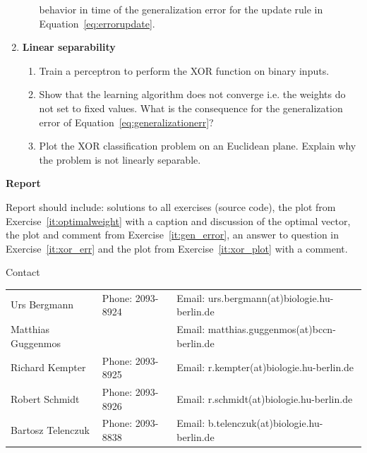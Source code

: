 \documentclass[12pt, a4]{article}
\begin{document}
\begin{enumerate}
\begin{enumerate}
                behavior in time of the generalization error for the update
                rule in Equation~\ref{eq:errorupdate}.
        \end{enumerate}
    \item \textbf{Linear separability}
        \begin{enumerate}
            \item Train a perceptron to perform the XOR function on binary
                inputs.
            \item \label{it:xor_err} Show that the learning algorithm does not converge
                i.e. the weights do not set to fixed values. What is the
                consequence for the generalization error of
                Equation~\ref{eq:generalizationerr}?
            \item \label{it:xor_plot} Plot the XOR classification problem on an
                Euclidean plane. Explain why the problem is not
                linearly separable. 
        \end{enumerate}

\end{enumerate}

{\bf Report}

Report should include: solutions to all exercises (source code), the plot
from Exercise~\ref{it:optimalweight} with a caption and discussion of
the optimal vector, the plot and comment from Exercise~\ref{it:gen_error},
an answer to question in Exercise~\ref{it:xor_err} and the plot from
Exercise~\ref{it:xor_plot} with a comment.

\vfill
\centerline{\CAP Contact}
\CAP

\begin{tabular}{lll}
Urs Bergmann & Phone: 2093-8924 & Email:
urs.bergmann(at)biologie.hu-berlin.de \\
Matthias Guggenmos & & Email: matthias.guggenmos(at)bccn-berlin.de \\
Richard Kempter \hfill & Phone: 2093-8925 \hfill & Email:
r.kempter(at)biologie.hu-berlin.de \\
Robert Schmidt & Phone: 2093-8926 & Email: r.schmidt(at)biologie.hu-berlin.de
\\
Bartosz Telenczuk & Phone: 2093-8838 & Email:
b.telenczuk(at)biologie.hu-berlin.de \\
\end{tabular}
\end{document}
